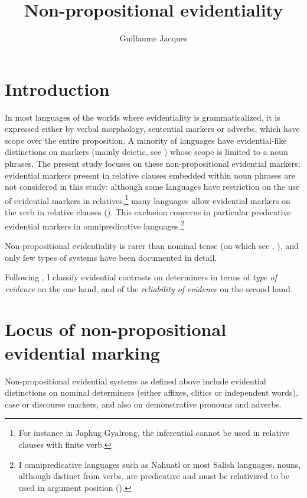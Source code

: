 \documentclass[oneside,a4paper,11pt]{article}
\begin{document}
 
\sloppy

\title{Non-propositional evidentiality}
\author{Guillaume Jacques}
\maketitle

\section{Introduction}
In most languages of the worlds where evidentiality is grammaticalized, it is expressed either by verbal morphology, sentential markers or adverbs, which have scope over the entire proposition. A minority of languages have evidential-like distinctions on markers (mainly deictic, see \citealt[130]{aikhenvald06}) whose scope is limited to a noun phrases. The present study focuses on these non-propositional evidential markers; evidential markers present in relative clauses embedded within noun phrases are not considered in this study: although some languages have restriction on the use of evidential markers in relatives,\footnote{For instance in Japhug Gyalrong, the inferential cannot be used in relative clauses with finite verb.} many languages allow evidential markers on the verb in relative clauses (\citealt[253-6]{aikhenvald06}). This exclusion concerns in particular predicative evidential markers in omnipredicative languages.\footnote{I omnipredicative languages such as Nahuatl or most Salish languages, nouns, although distinct from verbs, are predicative and must be relativized to be used in argument position (\citealt{launey94}).}

Non-propositional evidentiality is rarer than nominal tense (on which see \citealt{nordlinger04nominal}, \citealt[132]{francois05overview}), and only few types of systems have been documented in detail. 

Following \citet{gutierrez12determiners}, I classify evidential contrasts on determiners in terms of \textit{type of evidence} on the one hand, and of the \textit{reliability of evidence} on the second hand.

\section{Locus of non-propositional evidential marking} \label{sec:loc}
Non-propositional evidential systems as defined above include evidential distinctions on nominal determiners (either affixes, clitics or independent words), case or discourse markers, and also on demonstrative pronouns and adverbs.
\end{document}
